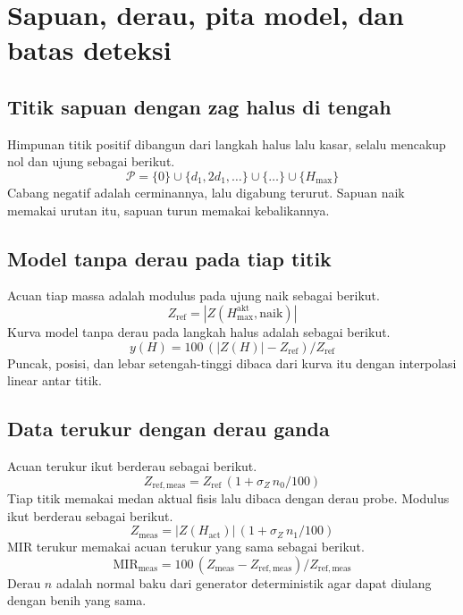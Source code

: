 \documentclass[a4paper,11pt]{article}
\begin{document}
\section{Sapuan, derau, pita model, dan batas deteksi}
\subsection{Titik sapuan dengan zag halus di tengah}
Himpunan titik positif dibangun dari langkah halus lalu kasar,
selalu mencakup nol dan ujung sebagai berikut.
\begin{equation*}
\mathcal{P} = \{0\}\cup\{d_{1},2d_{1},\dots\}\cup\{\dots\}\cup\{H_{\max}\}
\end{equation*}
Cabang negatif adalah cerminannya, lalu digabung terurut.
Sapuan naik memakai urutan itu, sapuan turun memakai kebalikannya.

\subsection{Model tanpa derau pada tiap titik}
Acuan tiap massa adalah modulus pada ujung naik sebagai berikut.
\begin{equation*}
Z_{\mathrm{ref}} = |Z(H_{\max}^{\mathrm{akt}},\mathrm{naik})|
\end{equation*}
Kurva model tanpa derau pada langkah halus adalah sebagai berikut.
\begin{equation*}
y(H) = 100\,(|Z(H)|-Z_{\mathrm{ref}})/Z_{\mathrm{ref}}
\end{equation*}
Puncak, posisi, dan lebar setengah-tinggi dibaca dari kurva itu
dengan interpolasi linear antar titik.

\subsection{Data terukur dengan derau ganda}
Acuan terukur ikut berderau sebagai berikut.
\begin{equation*}
Z_{\mathrm{ref,meas}} = Z_{\mathrm{ref}}\,(1+\sigma_{Z}\,n_{0}/100)
\end{equation*}
Tiap titik memakai medan aktual fisis lalu dibaca dengan derau probe.
Modulus ikut berderau sebagai berikut.
\begin{equation*}
Z_{\mathrm{meas}} = |Z(H_{\mathrm{act}})|\,(1+\sigma_{Z}\,n_{1}/100)
\end{equation*}
MIR terukur memakai acuan terukur yang sama sebagai berikut.
\begin{equation*}
\mathrm{MIR}_{\mathrm{meas}} = 100\,(Z_{\mathrm{meas}}-Z_{\mathrm{ref,meas}})/Z_{\mathrm{ref,meas}}
\end{equation*}
Derau $n$ adalah normal baku dari generator deterministik agar
dapat diulang dengan benih yang sama.
\end{document}
